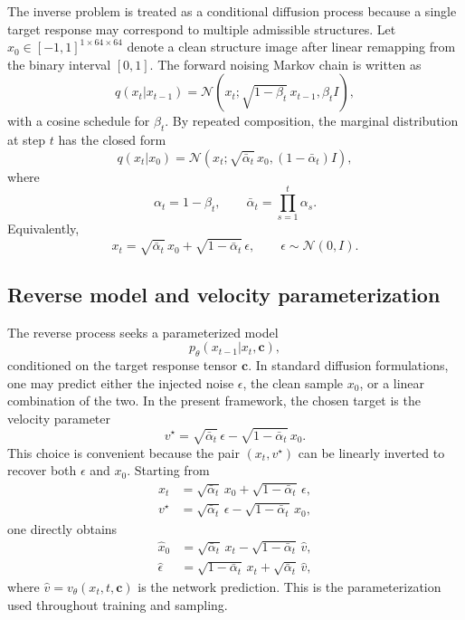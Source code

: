 \documentclass[10pt,a4paper]{article}
\begin{document}
The inverse problem is treated as a conditional diffusion process because a single target response may correspond to multiple admissible structures. Let $x_0\in[-1,1]^{1\times64\times64}$ denote a clean structure image after linear remapping from the binary interval $[0,1]$. The forward noising Markov chain is written as
\begin{equation}
q(x_t|x_{t-1})=\mathcal{N}\!\left(x_t;\sqrt{1-\beta_t}\,x_{t-1},\beta_t I\right),
\end{equation}
with a cosine schedule for $\beta_t$. By repeated composition, the marginal distribution at step $t$ has the closed form
\begin{equation}
q(x_t|x_0)=\mathcal{N}\!\left(x_t;\sqrt{\bar{\alpha}_t}\,x_0,(1-\bar{\alpha}_t)I\right),
\end{equation}
where
\begin{equation}
\alpha_t=1-\beta_t,\qquad \bar{\alpha}_t=\prod_{s=1}^{t}\alpha_s.
\end{equation}
Equivalently,
\begin{equation}
x_t=\sqrt{\bar{\alpha}_t}\,x_0+\sqrt{1-\bar{\alpha}_t}\,\epsilon,\qquad \epsilon\sim\mathcal{N}(0,I).
\end{equation}

\subsection{Reverse model and velocity parameterization}

The reverse process seeks a parameterized model
\begin{equation}
p_{\theta}(x_{t-1}|x_t,\mathbf{c}),
\end{equation}
conditioned on the target response tensor $\mathbf{c}$. In standard diffusion formulations, one may predict either the injected noise $\epsilon$, the clean sample $x_0$, or a linear combination of the two. In the present framework, the chosen target is the velocity parameter
\begin{equation}
v^\star=\sqrt{\bar{\alpha}_t}\,\epsilon-\sqrt{1-\bar{\alpha}_t}\,x_0.
\end{equation}
This choice is convenient because the pair $(x_t,v^\star)$ can be linearly inverted to recover both $\epsilon$ and $x_0$. Starting from
\begin{align}
x_t &= \sqrt{\bar{\alpha}_t}\,x_0+\sqrt{1-\bar{\alpha}_t}\,\epsilon,\\
v^\star &= \sqrt{\bar{\alpha}_t}\,\epsilon-\sqrt{1-\bar{\alpha}_t}\,x_0,
\end{align}
one directly obtains
\begin{align}
\hat{x}_0 &= \sqrt{\bar{\alpha}_t}\,x_t-\sqrt{1-\bar{\alpha}_t}\,\hat{v},\\
\hat{\epsilon} &= \sqrt{1-\bar{\alpha}_t}\,x_t+\sqrt{\bar{\alpha}_t}\,\hat{v},
\end{align}
where $\hat{v}=v_{\theta}(x_t,t,\mathbf{c})$ is the network prediction. This is the parameterization used throughout training and sampling.
\end{document}
